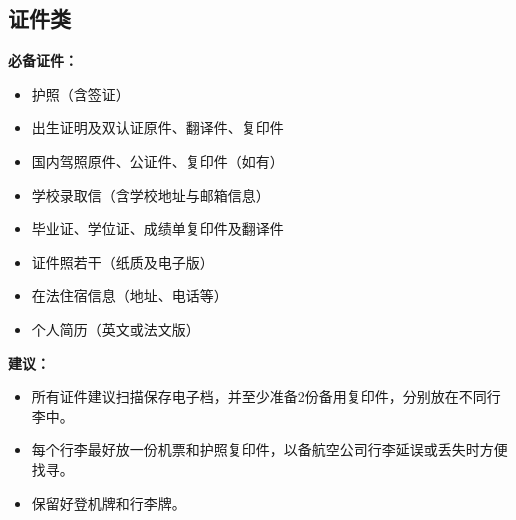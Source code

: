 \subsection{证件类}

\textbf{必备证件：}

\begin{itemize}
    \item 护照（含签证）
    \item 出生证明及双认证原件、翻译件、复印件
    \item 国内驾照原件、公证件、复印件（如有）
    \item 学校录取信（含学校地址与邮箱信息）
    \item 毕业证、学位证、成绩单复印件及翻译件
    \item 证件照若干（纸质及电子版）
    \item 在法住宿信息（地址、电话等）
    \item 个人简历（英文或法文版）
\end{itemize}

\textbf{建议：}

\begin{itemize}
    \item 所有证件建议扫描保存电子档，并至少准备2份备用复印件，分别放在不同行李中。
    \item 每个行李最好放一份机票和护照复印件，以备航空公司行李延误或丢失时方便找寻。
    \item 保留好登机牌和行李牌。
\end{itemize}

